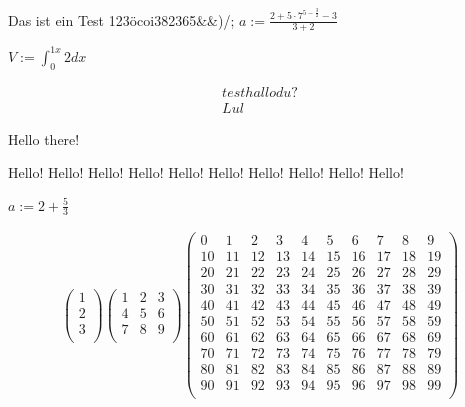 % 
%
\usepackage{amsmath}
\usepackage{test}


Das ist ein Test 123öcoi382365&&)/;
$a:=\frac{2+5 \cdot{} 7^{5-\frac{3}{2}}-3}{3+2}$

$V := \int_{0}^{1 x}2dx$

\begin{align}
    test hallo du?\\
    Lul
\end{align}

Hello there!

Hello!
Hello!
Hello!
Hello!
Hello!
Hello!
Hello!
Hello!
Hello!
Hello!


$a:=2+\frac{5}{3}$

\begin{align}
    \begin{pmatrix}
1\\
2\\
3\\
\end{pmatrix}
\begin{pmatrix}
1 & 2 & 3\\
4 & 5 & 6\\
7 & 8 & 9\\
\end{pmatrix}
\begin{pmatrix}
0 & 1 & 2 & 3 & 4 & 5 & 6 & 7 & 8 & 9\\
10 & 11 & 12 & 13 & 14 & 15 & 16 & 17 & 18 & 19\\
20 & 21 & 22 & 23 & 24 & 25 & 26 & 27 & 28 & 29\\
30 & 31 & 32 & 33 & 34 & 35 & 36 & 37 & 38 & 39\\
40 & 41 & 42 & 43 & 44 & 45 & 46 & 47 & 48 & 49\\
50 & 51 & 52 & 53 & 54 & 55 & 56 & 57 & 58 & 59\\
60 & 61 & 62 & 63 & 64 & 65 & 66 & 67 & 68 & 69\\
70 & 71 & 72 & 73 & 74 & 75 & 76 & 77 & 78 & 79\\
80 & 81 & 82 & 83 & 84 & 85 & 86 & 87 & 88 & 89\\
90 & 91 & 92 & 93 & 94 & 95 & 96 & 97 & 98 & 99\\
\end{pmatrix}

\end{align}



